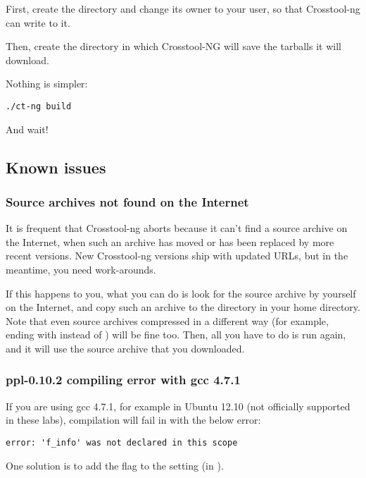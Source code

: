 First, create the directory  and change its
owner to your user, so that Crosstool-ng can write to it.

Then, create the directory  in which Crosstool-NG
will save the tarballs it will download.

Nothing is simpler:

\begin{verbatim}
./ct-ng build
\end{verbatim}

And wait!

\subsection{Known issues}

\subsubsection{Source archives not found on the Internet}

It is frequent that Crosstool-ng aborts because it can't find a
source archive on the Internet, when such an archive has moved or has
been replaced by more recent versions. New Crosstool-ng versions ship
with updated URLs, but in the meantime, you need work-arounds.

If this happens to you, what you can do is look for the source archive by
yourself on the Internet, and copy such an archive to the 
directory in your home directory. Note that even source archives
compressed in a different way (for example, ending with 
instead of ) will be fine too. Then, all you have to do is run
 again, and it will use the source archive that you
downloaded.

\subsubsection{ppl-0.10.2 compiling error with gcc 4.7.1}

If you are using gcc 4.7.1, for example in Ubuntu 12.10 (not officially
supported in these labs), compilation will fail in  with
the below error:

\begin{verbatim}
error: 'f_info' was not declared in this scope
\end{verbatim}

One solution is to add the  flag to the
 setting (in ). 

